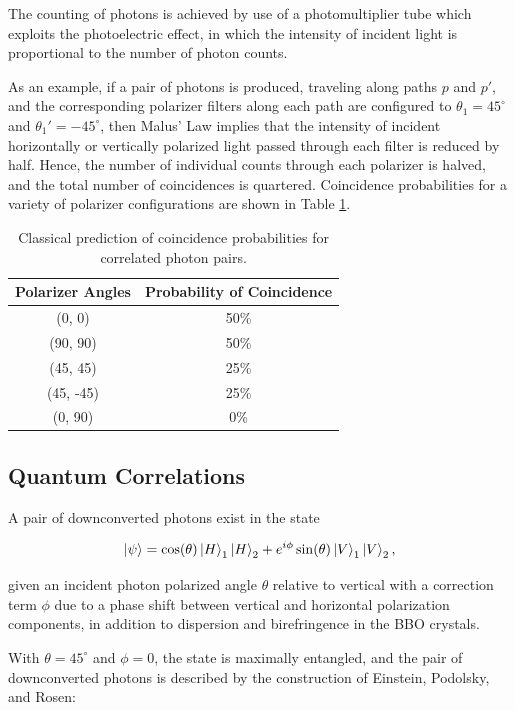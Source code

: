 \documentclass{article}
\begin{document}
The counting of photons is achieved by use of a photomultiplier tube which exploits the photoelectric effect, in which the intensity of incident light is proportional to the number of photon counts. 

As an example, if a pair of photons is produced, traveling along paths $p$ and $p'$, and the corresponding polarizer filters along each path are configured to $\theta_1 = 45^{\circ}$ and $\theta_1' = -45^{\circ}$, then Malus' Law implies that the intensity of incident horizontally or vertically polarized light passed through each filter is reduced by half. Hence, the number of individual counts through each polarizer is halved, and the total number of coincidences is quartered. Coincidence probabilities for a variety of polarizer configurations are shown in Table \ref{tab:classical}.

\begin{table}[!h]
  \centering
  \begin{tabular}{ c c }
    Polarizer Angles & Probability of Coincidence \\ \hline
    (0, 0) & 50\% \\
    (90, 90) & 50\% \\
    (45, 45) & 25\% \\
    (45, -45) & 25\% \\
    (0, 90) & 0\%
  \end{tabular}
  \caption{Classical prediction of coincidence probabilities for correlated photon pairs. \label{tab:classical}}
\end{table}

\subsection{Quantum Correlations}

A pair of downconverted photons exist in the state 

\begin{equation}
  \ket{\psi} = \cos(\theta) \ket{H}_1 \ket{H}_2 + e^{i\phi} \sin(\theta) \ket{V}_1 \ket{V}_2,
\end{equation}

given an incident photon polarized angle $\theta$ relative to vertical with a correction term $\phi$ due to a phase shift between vertical and horizontal polarization components, in addition to dispersion and birefringence in the BBO crystals.

With $\theta = 45^{\circ}$ and $\phi = 0$, the state is maximally entangled, and the pair of downconverted photons is described by the construction of Einstein, Podolsky, and Rosen:\cite{dehlinger}
\end{document}
